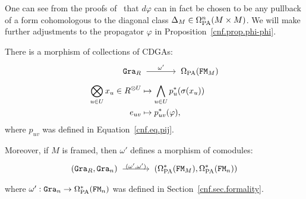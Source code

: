 One can see from the proofs of~\cite[Section 4]{CattaneoMneev2010} that $d\varphi$ can in fact be chosen to be any pullback of a form cohomologous to the diagonal class $\Delta_{M} \in \Omega_{\mathrm{PA}}^{n}(M \times M)$.
We will make further adjustments to the propagator $\varphi$ in Proposition~\ref{cnf.prop.phi-phi}.

\begin{proposition}
  \label{cnf.prop.zigzag-gra-r}
  There is a morphism of collections of CDGAs:
  \begin{align*}
    \Gra_{R}
    & \tkrightarrow{\omega'} \OmPA(\FM_{M}) \\
    \bigotimes_{u \in U} x_{u} \in R^{\otimes U}
    & \mapsto \bigwedge_{u \in U} p_{u}^{*}(\sigma(x_{u})) \\
    e_{uv}
    & \mapsto p_{uv}^{*}(\varphi),
  \end{align*}
  where $p_{uv}$ was defined in Equation~\eqref{cnf.eq.pij}.

  Moreover, if $M$ is framed, then $\omega'$ defines a morphism of comodules:
  \[ (\Gra_{R}, \Gra_{n}) \tkrightarrow{(\omega', \omega')} (\OmPA^{*}(\FM_{M}), \OmPA^{*}(\FM_{n})) \]
  where $\omega' : \mathtt{Gra}_{n} \to \Omega_{\mathrm{PA}}^{*}(\mathtt{FM}_{n})$ was defined in Section~\ref{cnf.sec.formality}.
\end{proposition}

